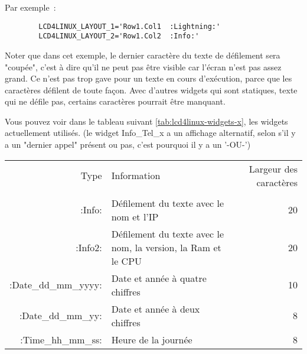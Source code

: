\begin{description}
  Par exemple~:
\begin{example}
\begin{verbatim}
        LCD4LINUX_LAYOUT_1='Row1.Col1  :Lightning:'
        LCD4LINUX_LAYOUT_2='Row1.Col2  :Info:'
\end{verbatim}
\end{example}

  Noter que dans cet exemple, le dernier caractère du texte de défilement sera "coupée",
  c'est à dire qu'il ne peut pas être visible car l'écran n'est pas assez grand.
  Ce n'est pas trop gave pour un texte en cours d'exécution, parce que les caractères
  défilent de toute façon. Avec d'autres widgets qui sont statiques, texte qui ne
  défile pas, certains caractères pourrait être manquant.

  Vous pouvez voir dans le tableau suivant \ref{tab:lcd4linux-widgets-x}, les widgets
  actuellement utilisés. (le widget Info\_Tel\_x a un affichage alternatif, selon s'il
  y a un "dernier appel" présent ou pas, c'est pourquoi il y a un '-OU-')

      \begin{small}
       \begin{center}
        \begin{longtable}{rp{7cm}r}

               Type &     Information   &             Largeur des caractères\\
               \\
                  :Info: &       Défilement du texte avec le nom et l'IP &  20 \\
                 :Info2: &       Défilement du texte avec le nom, la version, la Ram et le CPU &  20 \\

    :Date\_dd\_mm\_yyyy: &       Date et année à quatre chiffres &  10 \\
      :Date\_dd\_mm\_yy: &       Date et année à deux chiffres &   8 \\
      :Time\_hh\_mm\_ss: &       Heure de la journée        &   8 \\


\end{longtable}
\end{center}
\end{small}
\end{description}
